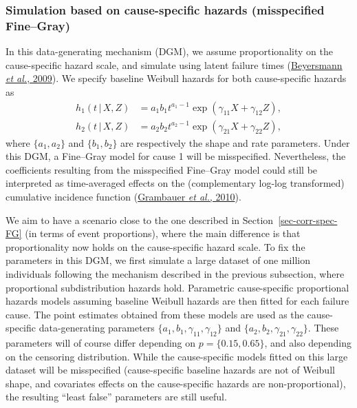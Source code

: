 \documentclass[
  letterpaper,
  DIV=11,
  numbers=noendperiod]{scrreprt}
\newcommand{\given}{\,|\,}
\begin{document}
\hypertarget{simulation-based-on-cause-specific-hazards-misspecified-finegray}{%
\subsubsection{Simulation based on cause-specific hazards (misspecified
Fine--Gray)}\label{simulation-based-on-cause-specific-hazards-misspecified-finegray}}

In this data-generating mechanism (DGM), we assume proportionality on
the cause-specific hazard scale, and simulate using latent failure times
(\protect\hyperlink{ref-beyersmannSimulatingCompetingRisks2009}{Beyersmann
\emph{et al.}, 2009}). We specify baseline Weibull hazards for both
cause-specific hazards as \begin{align*}
    h_1(t \given X, Z) &= a_1b_1t^{a_1 - 1}\exp(\gamma_{11}X + \gamma_{12}Z), \\
    h_2(t \given X, Z) &= a_2b_2t^{a_2 - 1}\exp(\gamma_{21}X + \gamma_{22}Z),
\end{align*} where \(\{a_1,a_2\}\) and \(\{b_1,b_2\}\) are respectively
the shape and rate parameters. Under this DGM, a Fine--Gray model for
cause 1 will be misspecified. Nevertheless, the coefficients resulting
from the misspecified Fine--Gray model could still be interpreted as
time-averaged effects on the (complementary log-log transformed)
cumulative incidence function
(\protect\hyperlink{ref-grambauerProportionalSubdistributionHazards2010}{Grambauer
\emph{et al.}, 2010}).

We aim to have a scenario close to the one described in
Section~\ref{sec-corr-spec-FG} (in terms of event proportions), where
the main difference is that proportionality now holds on the
cause-specific hazard scale. To fix the parameters in this DGM, we first
simulate a large dataset of one million individuals following the
mechanism described in the previous subsection, where proportional
subdistribution hazards hold. Parametric cause-specific proportional
hazards models assuming baseline Weibull hazards are then fitted for
each failure cause. The point estimates obtained from these models are
used as the cause-specific data-generating parameters
\(\{a_1,b_1, \gamma_{11}, \gamma_{12}\}\) and
\(\{a_2,b_2, \gamma_{21}, \gamma_{22}\}\). These parameters will of
course differ depending on \(p = \{0.15, 0.65\}\), and also depending on
the censoring distribution. While the cause-specific models fitted on
this large dataset will be misspecified (cause-specific baseline hazards
are not of Weibull shape, and covariates effects on the cause-specific
hazards are non-proportional), the resulting ``least false'' parameters
are still useful.
\end{document}
